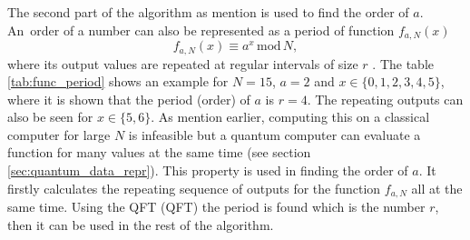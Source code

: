 The second part of the algorithm as mention is used to find the order of $a$. An~order of a number can also be represented as a period of function  $f_{a,N}(x)$
\begin{equation}
  f_{a,N}(x)\equiv a^x\,\mathrm{mod}\,N,
\end{equation}
where its output values are repeated at regular intervals of size $r$ \cite{Yanofsky2008}. The table \ref{tab:func_period} shows an example for $N=15$, $a=2$ and $x\in\{0,1,2,3,4,5\}$, where it is shown that the period (order) of $a$ is $r=4$. The repeating outputs can also be seen for $x\in\{5,6\}$. As mention earlier, computing this on a classical computer for large $N$ is infeasible but a quantum computer can evaluate a function for many values at the same time (see section \ref{sec:quantum_data_repr}). This property is used in finding the order of $a$. It firstly calculates the repeating sequence of outputs for the function $f_{a,N}$ all at the same time. Using the QFT (\acl{QFT}) the period is found which is the number $r$, then it can be used in the rest of the algorithm. \cite{McMahon2008}


